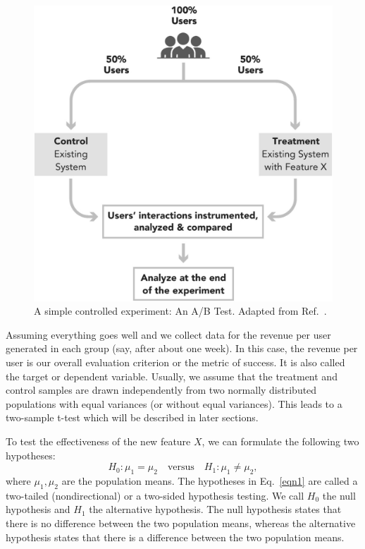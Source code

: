 \documentclass[10pt, aps,twocolumn, superscriptaddress, nofootinbib]{revtex4-2}
\begin{document}
 \begin{figure}[ht]
    \centering
    \includegraphics[scale=.8]{fig.png}
    \caption{A simple controlled experiment: An A/B Test. Adapted from Ref.~\cite{s1}.}
    \label{fig1}
\end{figure}

Assuming everything goes well and we collect data for the revenue per user generated in each group (say, after about one week). In this case, the revenue per user is our overall evaluation criterion or the metric of success. It is also called the target or dependent variable.   Usually, we assume that the treatment and control samples are drawn independently from two normally distributed populations with equal variances (or without equal variances). This leads to a two-sample t-test which will be described in later sections. 

To test the effectiveness of the new feature $X$, we can formulate the following two hypotheses:
\begin{equation}
	H_0: \mu_1 = \mu_2 \quad \text{versus}\quad H_1: \mu_1 \neq \mu_2,
	\label{eqn1}
\end{equation}
  where $\mu_1, \mu_2$ are the population means. The hypotheses in Eq.~\eqref{eqn1} are called a two-tailed (nondirectional) or a two-sided hypothesis testing. We call $H_0$ the null hypothesis and $H_1$ the alternative hypothesis. The null hypothesis states that there is no difference between the two population means, whereas the alternative hypothesis states that there is a difference between the two population means.
  
\end{document}
